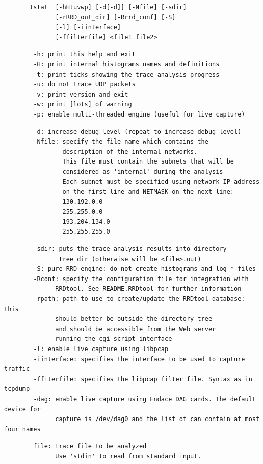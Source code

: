 \documentclass[11pt]{article}
\begin{document}
\begin{small}\begin{verbatim}
       tstat  [-hHtuvwp] [-d[-d]] [-Nfile] [-sdir]
              [-rRRD_out_dir] [-Rrrd_conf] [-S]
              [-l] [-iinterface]
              [-ffilterfile] <file1 file2>
\end{verbatim}\end{small} \noindent
\begin{small}\begin{verbatim}
        -h: print this help and exit
        -H: print internal histograms names and definitions
        -t: print ticks showing the trace analysis progress
        -u: do not trace UDP packets
        -v: print version and exit
        -w: print [lots] of warning
        -p: enable multi-threaded engine (useful for live capture)
\end{verbatim}\end{small} \noindent
\begin{small}\begin{verbatim}
        -d: increase debug level (repeat to increase debug level)
        -Nfile: specify the file name which contains the
                description of the internal networks.
                This file must contain the subnets that will be
                considered as 'internal' during the analysis
                Each subnet must be specified using network IP address
                on the first line and NETMASK on the next line:
                130.192.0.0
                255.255.0.0
                193.204.134.0
                255.255.255.0
\end{verbatim}\end{small} \noindent
\begin{small}\begin{verbatim}
        -sdir: puts the trace analysis results into directory
               tree dir (otherwise will be <file>.out)
        -S: pure RRD-engine: do not create histograms and log_* files
        -Rconf: specify the configuration file for integration with
              RRDtool. See README.RRDtool for further information
        -rpath: path to use to create/update the RRDtool database: this
              should better be outside the directory tree
              and should be accessible from the Web server
              running the cgi script interface
        -l: enable live capture using libpcap
        -iinterface: specifies the interface to be used to capture traffic
        -ffiterfile: specifies the libpcap filter file. Syntax as in tcpdump
        -dag: enable live capture using Endace DAG cards. The default device for 
              capture is /dev/dag0 and the list of can contain at most four names
\end{verbatim}\end{small} \noindent
\begin{small}\begin{verbatim}
        file: trace file to be analyzed
              Use 'stdin' to read from standard input.
\end{verbatim}\end{small} \noindent
\end{document}
